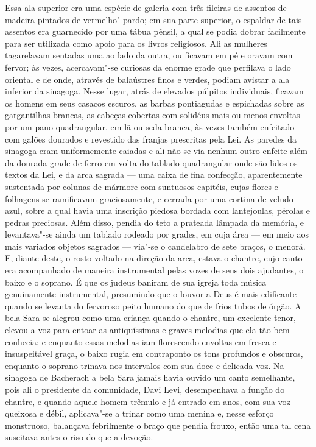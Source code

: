 Essa ala superior era uma espécie de galeria com três fileiras de
assentos de madeira pintados de vermelho"-pardo; em sua parte
superior, o espaldar de tais assentos era guarnecido por uma tábua
pênsil, a qual se podia dobrar facilmente para ser utilizada como apoio
para os livros religiosos. Ali as mulheres tagarelavam sentadas uma ao
lado da outra, ou ficavam em pé e oravam com fervor; às vezes,
acercavam"-se curiosas da enorme grade que perfilava o lado oriental e
de onde, através de balaústres finos e verdes, podiam avistar a ala
inferior da sinagoga. Nesse lugar, atrás de elevados púlpitos
individuais, ficavam os homens em seus casacos escuros, as barbas
pontiagudas e espichadas sobre as gargantilhas brancas, as cabeças
cobertas com solidéus mais ou menos envoltas por um pano quadrangular,
em lã ou seda branca, às vezes também enfeitado com galões dourados e
revestido das franjas prescritas pela Lei. As paredes da sinagoga eram
uniformemente caiadas e ali não se via nenhum outro enfeite além da
dourada grade de ferro em volta do tablado quadrangular onde são lidos
os textos da Lei, e da arca sagrada --- uma caixa de fina confecção,
aparentemente sustentada por colunas de mármore com suntuosos capitéis,
cujas flores e folhagens se ramificavam graciosamente, e cerrada por
uma cortina de veludo azul, sobre a qual havia uma inscrição piedosa
bordada com lantejoulas, pérolas e pedras preciosas. Além disso, pendia
do teto a prateada lâmpada da memória, e levantava"-se ainda um
tablado rodeado por grades, em cuja área --- em meio aos mais variados
objetos sagrados --- via"-se o candelabro de sete braços, o menorá. E,
diante deste, o rosto voltado na direção da arca, estava o chantre,
cujo canto era acompanhado de maneira instrumental pelas vozes de seus
dois ajudantes, o baixo e o soprano. É que os judeus baniram de sua
igreja toda música genuinamente instrumental, presumindo que o louvor a
Deus é mais edificante quando se levanta do fervoroso peito humano do
que de frios tubos de órgão. A bela Sara se alegrou como uma criança
quando o chantre, um excelente tenor, elevou a voz para entoar as
antiquíssimas e graves melodias que ela tão bem conhecia; e enquanto
essas melodias iam florescendo envoltas em fresca e insuspeitável
graça, o baixo rugia em contraponto os tons profundos e obscuros,
enquanto o soprano trinava nos intervalos com sua doce e delicada voz.
Na sinagoga de Bacherach a bela Sara jamais havia ouvido um canto
semelhante, pois ali o presidente da comunidade, Davi Levi,
desempenhava a função do chantre, e quando aquele homem trêmulo e já
entrado em anos, com sua voz queixosa e débil, aplicava"-se a trinar
como uma menina e, nesse esforço monstruoso, balançava febrilmente o
braço que pendia frouxo, então uma tal cena suscitava antes o riso do
que a devoção.

